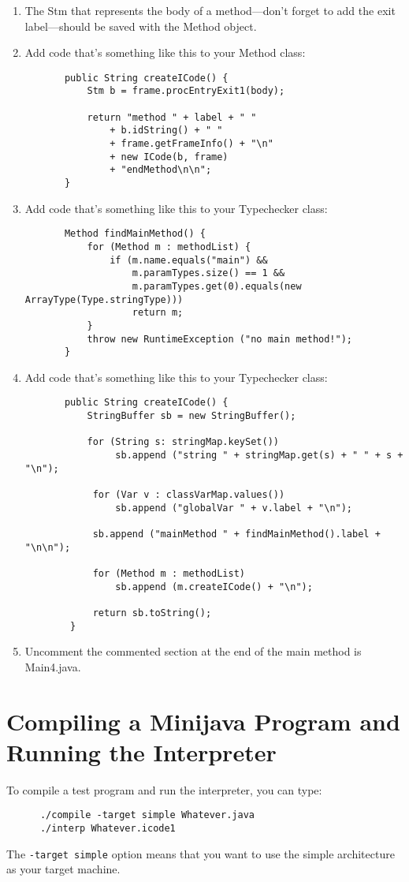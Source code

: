 \documentclass[11pt]{article}
\begin{document}
\begin{enumerate}
\item The Stm that represents the body of a method---don't forget to add the exit label---should be saved with the Method object.
\item Add code that's something like this to your Method class:
\begin{verbatim}
       public String createICode() {
           Stm b = frame.procEntryExit1(body);

           return "method " + label + " " 
               + b.idString() + " "
               + frame.getFrameInfo() + "\n" 
               + new ICode(b, frame)
               + "endMethod\n\n";
       }
\end{verbatim}
\item Add code that's something like this to your Typechecker class:
\begin{verbatim}
       Method findMainMethod() {
           for (Method m : methodList) {
               if (m.name.equals("main") &&
                   m.paramTypes.size() == 1 &&
                   m.paramTypes.get(0).equals(new ArrayType(Type.stringType)))
                   return m;
           }
           throw new RuntimeException ("no main method!");
       }
\end{verbatim}

\item Add code that's something like this to your Typechecker class:
\begin{verbatim}
       public String createICode() {
           StringBuffer sb = new StringBuffer();
        
           for (String s: stringMap.keySet())
                sb.append ("string " + stringMap.get(s) + " " + s + "\n");

            for (Var v : classVarMap.values())
                sb.append ("globalVar " + v.label + "\n");

            sb.append ("mainMethod " + findMainMethod().label + "\n\n");

            for (Method m : methodList)
                sb.append (m.createICode() + "\n");

            return sb.toString();
        }
\end{verbatim}
\item Uncomment the commented section at the end of the main method is Main4.java.

\end{enumerate}
 
\section{Compiling a Minijava Program and Running the Interpreter}
To compile a test program and run the interpreter, you can type:
\begin{verbatim}
      ./compile -target simple Whatever.java
      ./interp Whatever.icode1
\end{verbatim}
The \verb'-target simple' option means that you want to use the simple architecture as your target machine.
\end{document}

